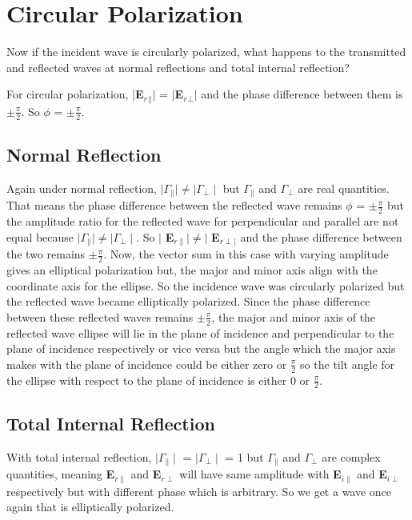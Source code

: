 \section{Circular Polarization}
Now if the incident wave is circularly polarized, what happens to the transmitted and reflected waves at normal reflections and total internal reflection?
 
For circular polarization, $\mid$\textbf{E$_r$$_\parallel$}$\mid$ = $\mid$\textbf{E$_r$$_\perp$}$\mid$ and the phase difference between them is $\pm\frac{\pi}{2}$. So $\phi$ = $\pm\frac{\pi}{2}$.

\subsection{Normal Reflection}
Again under  normal reflection, $\mid\Gamma_\parallel\mid \neq \mid\Gamma_\perp\mid$ but $\Gamma_\parallel$ and $\Gamma_\perp$ are real quantities. That means the phase difference between the reflected wave remains $\phi$ = $\pm\frac{\pi}{2}$ but the amplitude ratio for the reflected wave for perpendicular and parallel are not equal because $\mid\Gamma_\parallel\mid \neq \mid \Gamma_\perp \mid$. So $\mid$ \textbf{E}$_{r\parallel} \mid \neq \mid$ \textbf{E}$_{r\perp\mid}$ and the phase difference between the two remains $\pm\frac{\pi}{2}$. Now, the vector sum in this case with varying amplitude gives an elliptical polarization but, the major and minor axis align with the coordinate axis for the ellipse. So the incidence wave was circularly polarized but the reflected wave became elliptically polarized. Since the phase difference between these reflected waves remains $\pm\frac{\pi}{2}$, the major and minor axis of the reflected wave ellipse will lie in the plane of incidence and perpendicular to the plane of incidence respectively or vice versa but the angle which the major axis makes with the plane of incidence could be either zero or $\frac{\pi}{2}$ so the tilt angle for the ellipse with respect to the plane of incidence is either 0 or $\frac{\pi}{2}$.

\subsection{Total Internal Reflection}
With total internal reflection, $\mid\Gamma_\parallel\mid$ = $\mid\Gamma_\perp\mid$ = 1 but $\Gamma_\parallel$ and $\Gamma_\perp$ are complex quantities, meaning
\textbf{E}$_{r\parallel}$ and \textbf{E}$_{r\perp}$ will have same amplitude with \textbf{E}$_{i\parallel}$ and \textbf{E}$_{i\perp}$ respectively but with different phase which is arbitrary. So we get a wave once again that is elliptically polarized.

